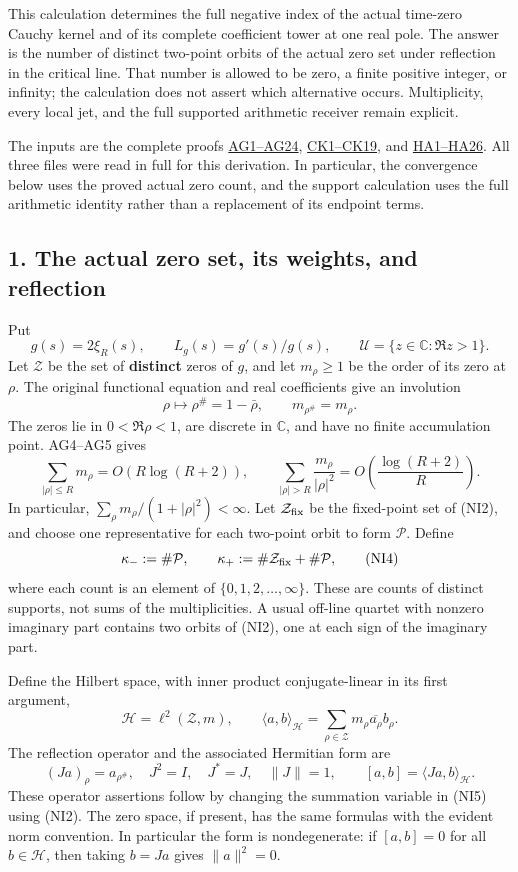 \documentclass[
  10pt,
  a4paper,
]{article}
\begin{document}
This calculation determines the full negative index of the actual
time-zero Cauchy kernel and of its complete coefficient tower at one
real pole. The answer is the number of distinct two-point orbits of the
actual zero set under reflection in the critical line. That number is
allowed to be zero, a finite positive integer, or infinity; the
calculation does not assert which alternative occurs. Multiplicity,
every local jet, and the full supported arithmetic receiver remain
explicit.

The inputs are the complete proofs
\href{ACTUAL_HEAT_ZERO_DISTRIBUTION_VARIATION.md}{AG1--AG24},
\href{CAUCHY_WEIL_POSITIVITY_CRITERION.md}{CK1--CK19}, and
\href{HEAT_CAUCHY_ARITHMETIC_DERIVATION.md}{HA1--HA26}. All three files
were read in full for this derivation. In particular, the convergence
below uses the proved actual zero count, and the support calculation
uses the full arithmetic identity rather than a replacement of its
endpoint terms.

\subsection{1. The actual zero set, its weights, and
reflection}\label{the-actual-zero-set-its-weights-and-reflection}

Put \[
g(s)=2\xi_R(s),\qquad L_g(s)=g'(s)/g(s),\qquad
\mathcal U=\{z\in\mathbb C:\Re z>1\}.
\tag{NI1}
\] Let \(\mathcal Z\) be the set of \textbf{distinct} zeros of \(g\),
and let \(m_\rho\ge1\) be the order of its zero at \(\rho\). The
original functional equation and real coefficients give an involution \[
\rho\longmapsto\rho^\#=1-\bar\rho,\qquad
m_{\rho^\#}=m_\rho.
\tag{NI2}
\] The zeros lie in \(0<\Re\rho<1\), are discrete in \(\mathbb C\), and
have no finite accumulation point. AG4--AG5 gives \[
\sum_{|\rho|\le R}m_\rho=O(R\log(R+2)),\qquad
\sum_{|\rho|>R}\frac{m_\rho}{|\rho|^2}
=O\left(\frac{\log(R+2)}R\right).
\tag{NI3}
\] In particular, \(\sum_\rho m_\rho/(1+|\rho|^2)<\infty\). Let
\(\mathcal Z_{\rm fix}\) be the fixed-point set of (NI2), and choose one
representative for each two-point orbit to form \(\mathcal P\). Define
\[
\kappa_-:=\#\mathcal P,\qquad
\kappa_+:=\#\mathcal Z_{\rm fix}+\#\mathcal P,
\tag{NI4}
\] where each count is an element of \(\{0,1,2,\ldots,\infty\}\). These
are counts of distinct supports, not sums of the multiplicities. A usual
off-line quartet with nonzero imaginary part contains two orbits of
(NI2), one at each sign of the imaginary part.

Define the Hilbert space, with inner product conjugate-linear in its
first argument, \[
\mathcal H=\ell^2(\mathcal Z,m),\qquad
\langle a,b\rangle_{\mathcal H}
=\sum_{\rho\in\mathcal Z}m_\rho\overline{a_\rho}b_\rho.
\tag{NI5}
\] The reflection operator and the associated Hermitian form are \[
(Ja)_\rho=a_{\rho^\#},\quad J^2=I,
\quad J^*=J,\quad \|J\|=1,
\qquad [a,b]=\langle Ja,b\rangle_{\mathcal H}.
\tag{NI6}
\] These operator assertions follow by changing the summation variable
in (NI5) using (NI2). The zero space, if present, has the same formulas
with the evident norm convention. In particular the form is
nondegenerate: if \([a,b]=0\) for all \(b\in\mathcal H\), then taking
\(b=Ja\) gives \(\|a\|^2=0\).
\end{document}
